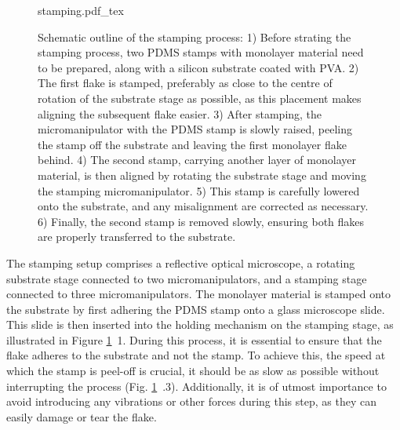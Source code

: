 \begin{figure}[h]
	\centering
	\def\svgwidth{1\linewidth}
	{stamping.pdf_tex}
	\caption{Schematic outline of the stamping process: 1) Before strating the stamping process, two PDMS stamps with monolayer material need to be prepared, along with a silicon substrate coated with PVA.
    2) The first flake is stamped, preferably as close to the centre of rotation of the substrate stage as possible, as this placement makes aligning the subsequent flake easier.
    3) After stamping, the micromanipulator with the PDMS stamp is slowly raised, peeling the stamp off the substrate and leaving the first monolayer flake behind. 
    4) The second stamp, carrying another layer of monolayer material, is then aligned by rotating the substrate stage and moving the stamping micromanipulator. 
    5) This stamp is carefully lowered onto the substrate, and any misalignment are corrected as necessary. 
    6) Finally, the second stamp is removed slowly, ensuring both flakes are properly transferred to the substrate.}
    
\label{fig:stamping_process}
\end{figure}

The stamping setup comprises a reflective optical microscope, a rotating substrate stage connected to two micromanipulators, and a stamping stage connected to three micromanipulators.
%
The monolayer material is stamped onto the substrate by first adhering the PDMS stamp onto a glass microscope slide.
%
This slide is then inserted into the holding mechanism on the stamping stage, as illustrated in Figure \ref{fig:stamping_process}~1.
%
During this process, it is essential to ensure that the flake adheres to the substrate and not the stamp.
%
To achieve this, the speed at which the stamp is peel-off is crucial, it should be as slow as possible without interrupting the process (Fig. \ref{fig:stamping_process}~.3).
%
Additionally, it is of utmost importance to avoid introducing any vibrations or other forces during this step, as they can easily damage or tear the flake.

